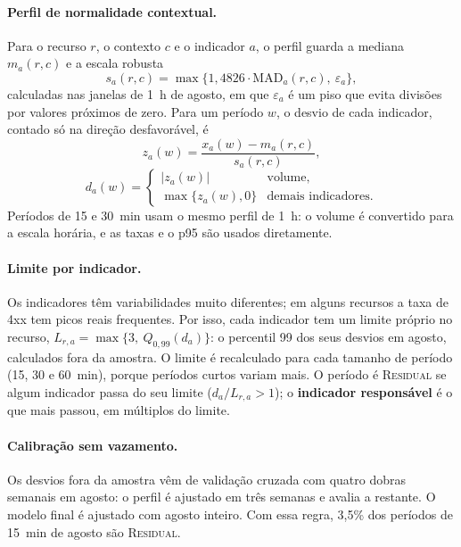 \documentclass[sigconf,nonacm]{acmart}
\newcommand{\Residual}{\textsc{Residual}\xspace}
\begin{document}
\paragraph{Perfil de normalidade contextual.} Para o recurso $r$, o contexto $c$ e o indicador $a$, o perfil guarda a mediana $m_a(r,c)$ e a escala robusta~\citep{leys2013mad}
\begin{equation}
  s_a(r,c)=\max\{1{,}4826\cdot\mathrm{MAD}_a(r,c),\ \varepsilon_a\},
\end{equation}
calculadas nas janelas de 1~h de agosto, em que $\varepsilon_a$ é um piso que evita divisões por valores próximos de zero. Para um período $w$, o desvio de cada indicador, contado só na direção desfavorável, é
\begin{equation}
  z_a(w)=\frac{x_a(w)-m_a(r,c)}{s_a(r,c)},
\end{equation}
\begin{equation}
  d_a(w)=\begin{cases}|z_a(w)| & \text{volume,}\\ \max\{z_a(w),0\} & \text{demais indicadores.}\end{cases}
\end{equation}
Períodos de 15 e 30~min usam o mesmo perfil de 1~h: o volume é convertido para a escala horária, e as taxas e o p95 são usados diretamente.

\paragraph{Limite por indicador.} Os indicadores têm variabilidades muito diferentes; em alguns recursos a taxa de 4xx tem picos reais frequentes. Por isso, cada indicador tem um limite próprio no recurso, $L_{r,a}=\max\{3,\ Q_{0{,}99}(d_a)\}$: o percentil 99 dos seus desvios em agosto, calculados fora da amostra. O limite é recalculado para cada tamanho de período (15, 30 e 60~min), porque períodos curtos variam mais. O período é \Residual se algum indicador passa do seu limite ($d_a/L_{r,a}>1$); o \textbf{indicador responsável} é o que mais passou, em múltiplos do limite.

\paragraph{Calibração sem vazamento.} Os desvios fora da amostra vêm de validação cruzada com quatro dobras semanais em agosto: o perfil é ajustado em três semanas e avalia a restante. O modelo final é ajustado com agosto inteiro. Com essa regra, 3,5\% dos períodos de 15~min de agosto são \Residual.
\end{document}
